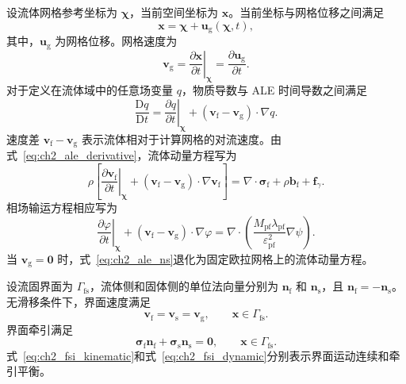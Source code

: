 设流体网格参考坐标为 $\boldsymbol{\chi}$，当前空间坐标为 $\boldsymbol{x}$。当前坐标与网格位移之间满足
\begin{equation}
\boldsymbol{x}
=
\boldsymbol{\chi}
+
\boldsymbol{u}_{\mathrm g}(\boldsymbol{\chi},t),
\label{eq:ch2_ale_mapping}
\end{equation}
其中，$\boldsymbol{u}_{\mathrm g}$ 为网格位移。网格速度为
\begin{equation}
\boldsymbol{v}_{\mathrm g}
=
\left.
\frac{\partial\boldsymbol{x}}{\partial t}
\right|_{\boldsymbol{\chi}}
=
\frac{\partial\boldsymbol{u}_{\mathrm g}}{\partial t}.
\label{eq:ch2_mesh_velocity}
\end{equation}
对于定义在流体域中的任意场变量 $q$，物质导数与 ALE 时间导数之间满足
\begin{equation}
\frac{\mathrm{D} q}{\mathrm{D} t}
=
\left.
\frac{\partial q}{\partial t}
\right|_{\boldsymbol{\chi}}
+
\left(%
\boldsymbol{v}_{\mathrm f}
-
\boldsymbol{v}_{\mathrm g}
\right)
\cdot\nabla q.
\label{eq:ch2_ale_derivative}
\end{equation}
速度差 $\boldsymbol{v}_{\mathrm f}-\boldsymbol{v}_{\mathrm g}$ 表示流体相对于计算网格的对流速度。由式~\eqref{eq:ch2_ale_derivative}，流体动量方程写为
\begin{equation}
\rho
\left[
\left.
\frac{\partial\boldsymbol{v}_{\mathrm f}}{\partial t}
\right|_{\boldsymbol{\chi}}
+
\left(%
\boldsymbol{v}_{\mathrm f}-\boldsymbol{v}_{\mathrm g}
\right)
\cdot\nabla\boldsymbol{v}_{\mathrm f}
\right]
=
\nabla\cdot\boldsymbol{\sigma}_{\mathrm f}
+
\rho\boldsymbol{b}_{\mathrm f}
+
\boldsymbol{f}_{\gamma}.
\label{eq:ch2_ale_ns}
\end{equation}
相场输运方程相应写为
\begin{equation}
\left.
\frac{\partial\varphi}{\partial t}
\right|_{\boldsymbol{\chi}}
+
\left(%
\boldsymbol{v}_{\mathrm f}-\boldsymbol{v}_{\mathrm g}
\right)
\cdot\nabla\varphi
=
\nabla\cdot
\left(%
\frac{M_{\mathrm{pf}}\lambda_{\mathrm{pf}}}
{\varepsilon_{\mathrm{pf}}^2}
\nabla\psi
\right).
\label{eq:ch2_ale_cahn_hilliard}
\end{equation}
当 $\boldsymbol{v}_{\mathrm g}=\boldsymbol{0}$ 时，式~\eqref{eq:ch2_ale_ns}退化为固定欧拉网格上的流体动量方程。

设流固界面为 $\Gamma_{\mathrm{fs}}$，流体侧和固体侧的单位法向量分别为 $\boldsymbol{n}_{\mathrm f}$ 和 $\boldsymbol{n}_{\mathrm s}$，且 $\boldsymbol{n}_{\mathrm f}=-\boldsymbol{n}_{\mathrm s}$。无滑移条件下，界面速度满足
\begin{equation}
\boldsymbol{v}_{\mathrm f}
=
\boldsymbol{v}_{\mathrm s}
=
\boldsymbol{v}_{\mathrm g},
\qquad
\boldsymbol{x}\in\Gamma_{\mathrm{fs}}.
\label{eq:ch2_fsi_kinematic}
\end{equation}
界面牵引满足
\begin{equation}
\boldsymbol{\sigma}_{\mathrm f}\boldsymbol{n}_{\mathrm f}
+
\boldsymbol{\sigma}_{\mathrm s}\boldsymbol{n}_{\mathrm s}
=
\boldsymbol{0},
\qquad
\boldsymbol{x}\in\Gamma_{\mathrm{fs}}.
\label{eq:ch2_fsi_dynamic}
\end{equation}
式~\eqref{eq:ch2_fsi_kinematic}和式~\eqref{eq:ch2_fsi_dynamic}分别表示界面运动连续和牵引平衡\cite{hou2012numerical}。

